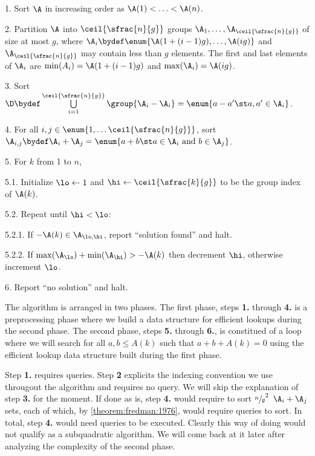 \begin{algorithm}

\item[1.] Sort $\A$ in increasing order as $\A(1) < \ldots < \A(n)$.

\item[2.] Partition $\A$ into $\ceil{\sfrac{n}{g}}$ groups $\A_1, \ldots,
\A_{\ceil{\sfrac{n}{g}}}$ of size at most $g$, where $\A_i \bydef \enum{\A(1 + (i-1)g),
\ldots, \A(ig)}$ and $\A_{\ceil{\sfrac{n}{g}}}$ may contain less than $g$ elements.
The first and last elements of $\A_i$ are $\min(A_i) = \A(1 + (i-1)g)$ and
$\max(\A_i) = \A(ig)$.

\item[3.] Sort $\D \bydef \bigcup\limits_{i = 1}^{\ceil{\sfrac{n}{g}}}
\group{\A_i-\A_i} = \enum{a - a' \st a, a' \in \A_i}$.

\item[4.] For all $i,j \in \enum{1, \ldots \ceil{\sfrac{n}{g}}}$, sort $\A_{i,j}
\bydef \A_i + \A_j = \enum{a + b \st a \in \A_i \text{ and } b \in \A_j}$.

\item[5.] For $k$ from 1 to $n$,

\item[5.1.] Initialize $\lo \gets 1$ and $\hi \gets \ceil{\sfrac{k}{g}}$ to be
the group index of $\A(k)$.

\item[5.2.] Repeat until $\hi < \lo$:

\item[5.2.1.] If $-\A(k) \in \A_{\lo,\hi}$, report ``solution found'' and halt.

\item[5.2.2.] If $\max(\A_{\lo}) + \min(\A_{\hi}) > -\A(k)$ then decrement
$\hi$, otherwise increment $\lo$.

\item[6.] Report ``no solution'' and halt.

\end{algorithm}

The algorithm is arranged in two phases. The first phase, steps \textbf{1.}
through \textbf{4.} is a preprocessing phase where we build a data structure
for efficient lookups during the second phase. The second phase, steps
\textbf{5.} through \textbf{6.}, is constitued of a loop where we will search
for all $a, b \le A(k)$ such that $a + b + A(k) = 0$ using the efficient lookup
data structure built during the first phase.

Step \textbf{1.} requires  queries. Step \textbf{2} explicits
the indexing convention we use througout the algorithm and requires no query.
We will skip the explanation of step \textbf{3.} for the moment. If done as is,
step \textbf{4.} would require to sort $\sfrac{n}{g}^2$ $\A_i + \A_j$ sets,
each of which, by \ref{theorem:fredman:1976}, would require  queries
to sort. In total, step \textbf{4.} would need  queries to be
executed. Clearly this way of doing would not qualify as a subquadratic
algorithm. We will come back at it later after analyzing the complexity of the
second phase.


